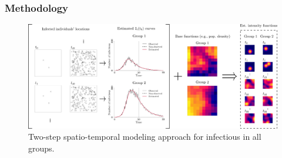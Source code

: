 \documentclass[12pt, aspectratio = 169]{beamer} %
\begin{document}
	\begin{frame}[t]
		\frametitle{Methodology}
		\justifying
		
		\begin{figure}[!ht]
			\centering
			\includegraphics[width = 1\textwidth]{Images/diagram.png}
			\caption{\justifying Two-step\hspace{-1pt} spatio-temporal\hspace{-1pt} modeling\hspace{-1pt} approach for infectious in all groups.}
			\label{fig:diagramST}
		\end{figure}
		
	\end{frame}
	
\end{document}
